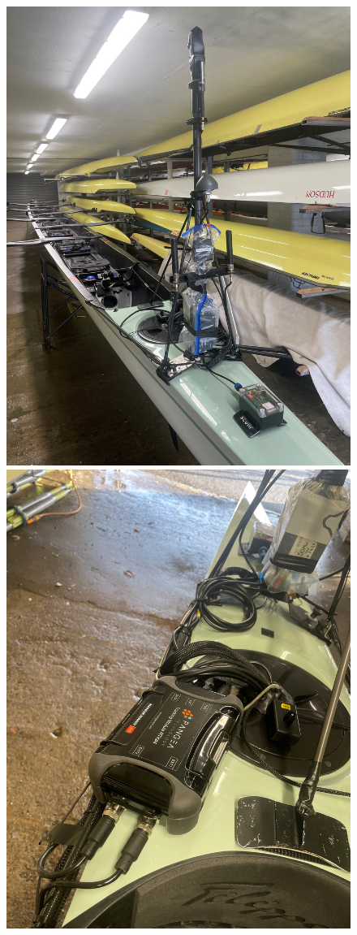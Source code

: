 \documentclass[12pt,a4paper]{report}
\begin{document}
\begin{figure}[h]
\begin{center}
\includegraphics[scale=0.07]{boatrace1.jpg}           \includegraphics[scale=0.07]{boatrace2.jpg}

\end{center}
\end{figure}
\end{document}
